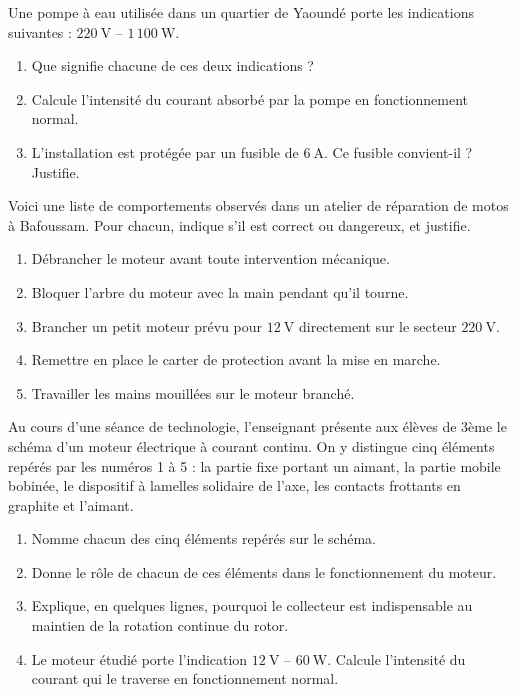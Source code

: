 \documentclass[11pt]{article}
\newcounter{popsec}
\newcounter{popsub}
\newcommand{\courssub}[1]{%
  \stepcounter{popsub}%
  \par\vspace{9pt}\noindent{\popxbold\fontsize{11.5}{13}\selectfont\color{popink}{\color{poporange}\thepopsec.\thepopsub}\hspace{6pt}#1}\par\nopagebreak\vspace{4pt}
}
\begin{document}
\begin{exercice}
Une pompe à eau utilisée dans un quartier de Yaoundé porte les indications suivantes : $220~\text{V}$ -- $1\,100~\text{W}$.
\begin{enumerate}
\item Que signifie chacune de ces deux indications ?
\item Calcule l'intensité du courant absorbé par la pompe en fonctionnement normal.
\item L'installation est protégée par un fusible de $6~\text{A}$. Ce fusible convient-il ? Justifie.
\end{enumerate}
\end{exercice}

\begin{exercice}
Voici une liste de comportements observés dans un atelier de réparation de motos à Bafoussam. Pour chacun, indique s'il est correct ou dangereux, et justifie.
\begin{enumerate}
\item Débrancher le moteur avant toute intervention mécanique.
\item Bloquer l'arbre du moteur avec la main pendant qu'il tourne.
\item Brancher un petit moteur prévu pour $12~\text{V}$ directement sur le secteur $220~\text{V}$.
\item Remettre en place le carter de protection avant la mise en marche.
\item Travailler les mains mouillées sur le moteur branché.
\end{enumerate}
\end{exercice}

\courssub{Je me prépare au Bac}

\begin{exercice}
Au cours d'une séance de technologie, l'enseignant présente aux élèves de 3ème le schéma d'un moteur électrique à courant continu. On y distingue cinq éléments repérés par les numéros 1 à 5 : la partie fixe portant un aimant, la partie mobile bobinée, le dispositif à lamelles solidaire de l'axe, les contacts frottants en graphite et l'aimant.
\begin{enumerate}
\item Nomme chacun des cinq éléments repérés sur le schéma.
\item Donne le rôle de chacun de ces éléments dans le fonctionnement du moteur.
\item Explique, en quelques lignes, pourquoi le collecteur est indispensable au maintien de la rotation continue du rotor.
\item Le moteur étudié porte l'indication $12~\text{V}$ -- $60~\text{W}$. Calcule l'intensité du courant qui le traverse en fonctionnement normal.
\end{enumerate}
\end{exercice}
\end{document}
